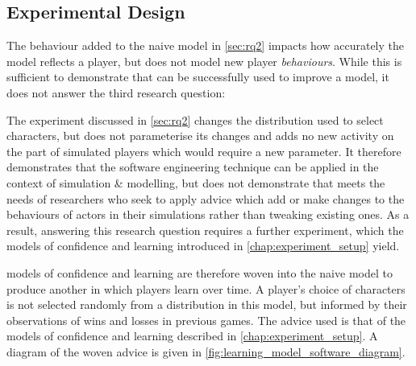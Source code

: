 \subsection{Experimental Design}

The behaviour added to the naive model in \cref{sec:rq2} impacts how accurately
the model reflects a player, but does not model new player \emph{behaviours}.
While this is sufficient to demonstrate that \aop{} can be successfully used to
improve a model, it does not answer the third research question:

\begin{researchquestion}
\rqthree{}
\end{researchquestion}


The experiment discussed in \cref{sec:rq2} changes the distribution used to
select characters, but does not parameterise its changes and adds no new
activity on the part of simulated players which would require a new parameter.
It therefore demonstrates that the software engineering technique can be applied
in the context of simulation \& modelling, but does not demonstrate that \aop
meets the needs of researchers who seek to apply advice which add or make changes to
the behaviours of actors in their simulations rather than tweaking existing
ones. As a result, answering this research question requires a further
experiment, which the \aspectoriented models of confidence and learning
introduced in \cref{chap:experiment_setup} yield.

\Aspectoriented{} models of confidence and learning are therefore woven into the naive model to
produce another in which players learn over time. A player's choice of
characters is not selected randomly from a distribution in this model, but
informed by their observations of wins and losses in previous games. The advice
used is that of the models of confidence and learning described in
\cref{chap:experiment_setup}. A diagram of the woven advice is given in
\cref{fig:learning_model_software_diagram}.

